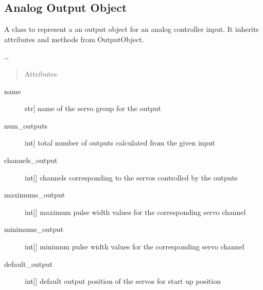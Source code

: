 \documentclass[letterpaper,10pt,english]{sphinxmanual}
\begin{document}
\subsection{Analog Output Object}
\label{\detokenize{generic:module-AnalogOutputObject}}\label{\detokenize{generic:analog-output-object}}

\begin{fulllineitems}
\label{\detokenize{generic:AnalogOutputObject.AnalogOutputObject}}
\sphinxAtStartPar
A class to represent a an output object for an analog controller input.
It inherits attributes and methods from OutputObject.

\sphinxAtStartPar
…
\begin{quote}\begin{description}
\item[{Attributes}] \leavevmode
\end{description}\end{quote}
\begin{description}
\item[{name}] \leavevmode{[}str{]}
\sphinxAtStartPar
name of the servo group for the output

\item[{num\_outputs}] \leavevmode{[}int{]}
\sphinxAtStartPar
total number of outputs calculated from the given input

\item[{channels\_output}] \leavevmode{[}{[}int{]}{]}
\sphinxAtStartPar
channels corresponding to the servos controlled by the outputs

\item[{maximums\_output}] \leavevmode{[}{[}int{]}{]}
\sphinxAtStartPar
maximum pulse width values for the corresponding servo channel

\item[{minimums\_output}] \leavevmode{[}{[}int{]}{]}
\sphinxAtStartPar
minimum pulse width values for the corresponding servo channel

\item[{default\_output}] \leavevmode{[}{[}int{]}{]}
\sphinxAtStartPar
default output position of the servos for start up position


\end{description}
\end{fulllineitems}
\end{document}
